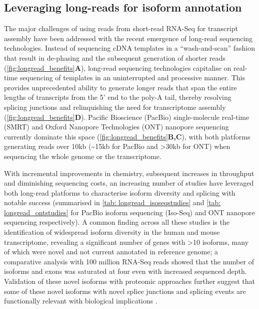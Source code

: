 \subsection{Leveraging long-reads for isoform annotation}
The major challenges of using reads from short-read RNA-Seq for transcript assembly have been addressed with the recent emergence of long-read sequencing technologies. Instead of sequencing cDNA templates in a “wash-and-scan” fashion that result in de-phasing and the subsequent generation of shorter reads (\cref{fig:longread_benefits}\textbf{A}), long-read sequencing technologies capitalise on real-time sequencing of templates in an uninterrupted and processive manner. This provides unprecedented ability to generate longer reads that span the entire lengths of transcripts from the 5' end to the poly-A tail, thereby resolving splicing junctions and relinquishing the need for transcriptome assembly (\cref{fig:longread_benefits}\textbf{D}). Pacific Bioscience (PacBio) single-molecule real-time (SMRT) and Oxford Nanopore Technologies (ONT) nanopore sequencing currently dominate this space (\cref{fig:longread_benefits}\textbf{B,C}), with both platforms generating reads over 10kb (\textasciitilde15kb for PacBio and >30kb for ONT) when sequencing the whole genome or the transcriptome.  

With incremental improvements in chemistry, subsequent increases in throughput and diminishing sequencing costs, an increasing number of studies have leveraged both long-read platforms to characterise isoform diversity and splicing with notable success (summarised in \cref{tab: longread_isoseqstudies} and \cref{tab: longread_ontstudies} for PacBio isoform sequencing (Iso-Seq) and ONT nanopore sequencing respectively). A common finding across all these studies is the identification of widespread isoform diversity in the human and mouse transcriptome\cite{Sharon2013, Au2013,Tseng2019,DeslattesMays2019}, revealing a significant number of genes with >10 isoforms, many of which were novel and not current annotated in reference genome; a comparative analysis with 100 million RNA-Seq reads showed that the number of isoforms and exons was saturated at four even with increased sequenced depth\cite{DeslattesMays2019}. Validation of these novel isoforms with proteomic approaches further suggest that some of these novel isoforms with novel splice junctions and splicing events are functionally relevant with biological implications \cite{Huang2021}. 


